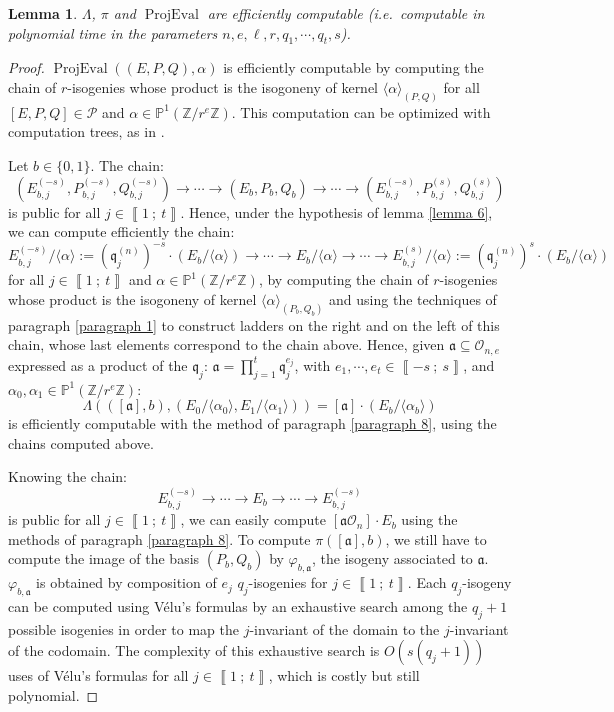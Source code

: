 \documentclass[a4paper,10pt]{report}
\theoremstyle{definition}
\theoremstyle{plain}
\newtheorem{lemma}[definition]{Lemma}
\theoremstyle{definition}
\newcommand{\ie}{\emph{i.e.}\ }
\newcommand{\Z}{\mathbb{Z}}
\newcommand{\m}[1]{\mathcal{#1}}
\newcommand{\mO}{\mathcal{O}}
\renewcommand{\i}[2]{\left\llbracket #1~;~#2\right\rrbracket}
\renewcommand{\(}{\left(}
\renewcommand{\)}{\right)}
\renewcommand{\P}{\mathbb{P}}
\newcommand{\mf}[1]{\mathfrak{#1}}
\DeclareMathOperator{\ProjEval}{ProjEval}
\begin{document}
\begin{lemma}
$\Lambda$, $\pi$ and $\ProjEval$ are efficiently computable (\ie computable in polynomial time in the parameters $n, e,\ell, r, q_1, \cdots, q_t,s$).
\end{lemma}

\begin{proof}
$\ProjEval((E,P,Q),\alpha)$ is efficiently computable by computing the chain of $r$-isogenies whose product is the isogoneny of kernel $\langle\alpha\rangle_{(P,Q)}$ for all $[E,P,Q]\in \m{P}$ and $\alpha\in\P^1(\Z/r^e\Z)$. This computation can be optimized with computation trees, as in \cite[section 4.2.2]{DeFeoSIDH}.

Let $b\in\{0,1\}$. The chain:
\[(E_{b,j}^{(-s)},P_{b,j}^{(-s)},Q_{b,j}^{(-s)})\longrightarrow \cdots \longrightarrow (E_{b},P_b,Q_b)\longrightarrow \cdots\longrightarrow (E_{b,j}^{(-s)},P_{b,j}^{(s)},Q_{b,j}^{(s)})\]
is public for all $j\in\i{1}{t}$. Hence, under the hypothesis of lemma \ref{lemma 6}, we can compute efficiently the chain:
\[E_{b,j}^{(-s)}/\langle\alpha\rangle:=(\mf{q}_j^{(n)})^{-s}\cdot (E_b/\langle\alpha\rangle)\longrightarrow \cdots \longrightarrow E_b/\langle\alpha\rangle\longrightarrow \cdots\longrightarrow E_{b,j}^{(s)}/\langle\alpha\rangle:=(\mf{q}_j^{(n)})^{s}\cdot(E_b/\langle\alpha\rangle)\]
for all $j\in\i{1}{t}$ and $\alpha\in\P^1(\Z/r^e\Z)$, by computing the chain of $r$-isogenies whose product is the isogoneny of kernel $\langle\alpha\rangle_{(P_b,Q_b)}$ and using the techniques of paragraph \ref{paragraph 1} to construct ladders on the right and on the left of this chain, whose last elements correspond to the chain above. Hence, given $\mf{a}\subseteq\mO_{n,e}$ expressed as a product of the $\mf{q}_j$: $\mf{a}=\prod_{j=1}^t\mf{q}_j^{e_j}$, with $e_1, \cdots, e_t\in\i{-s}{s}$, and $\alpha_0,\alpha_1\in\P^1(\Z/r^e\Z)$:
\[\Lambda(([\mf{a}],b),(E_0/\langle\alpha_0\rangle,E_1/\langle\alpha_1\rangle))=[\mf{a}]\cdot (E_b/\langle\alpha_b\rangle)\] 
is efficiently computable with the method of paragraph \ref{paragraph 8}, using the chains computed above. 

Knowing the chain:
\[E_{b,j}^{(-s)}\longrightarrow \cdots \longrightarrow E_{b}\longrightarrow \cdots\longrightarrow E_{b,j}^{(-s)}\]
is public for all $j\in\i{1}{t}$, we can easily compute $[\mf{a}\mO_n]\cdot E_b$ using the methods of paragraph \ref{paragraph 8}.  To compute $\pi([\mf{a}],b)$, we still have to compute the image of the basis $(P_b,Q_b)$ by $\varphi_{b,\mf{a}}$, the isogeny associated to $\mf{a}$.  $\varphi_{b,\mf{a}}$ is obtained by composition of $e_j$ $q_j$-isogenies for $j\in\i{1}{t}$.  Each $q_j$-isogeny can be computed using V\'{e}lu's formulas by an exhaustive search among the $q_j+1$ possible isogenies in order to map the $j$-invariant of the domain to the $j$-invariant of the codomain. The complexity of this exhaustive search is $O(s(q_j+1))$ uses of V\'{e}lu's formulas for all $j\in\i{1}{t}$, which is costly but still polynomial.
\end{proof}
\end{document}
